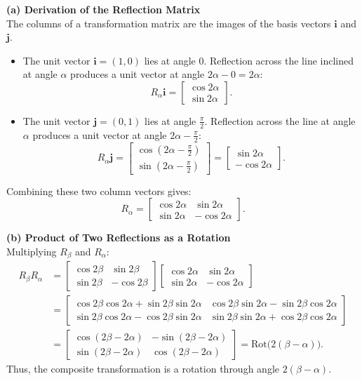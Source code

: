 \begin{solution}
\textbf{(a) Derivation of the Reflection Matrix} \\
The columns of a transformation matrix are the images of the basis vectors $\mathbf{i}$ and $\mathbf{j}$.
\begin{itemize}[leftmargin=*]
    \item The unit vector $\mathbf{i} = (1, 0)$ lies at angle $0$. Reflection across the line inclined at angle $\alpha$ produces a unit vector at angle $2\alpha - 0 = 2\alpha$:
    \[
    R_\alpha \mathbf{i} = \begin{bmatrix} \cos 2\alpha \\ \sin 2\alpha \end{bmatrix}.
    \]
    \item The unit vector $\mathbf{j} = (0, 1)$ lies at angle $\frac{\pi}{2}$. Reflection across the line at angle $\alpha$ produces a unit vector at angle $2\alpha - \frac{\pi}{2}$:
    \[
    R_\alpha \mathbf{j} = \begin{bmatrix} \cos(2\alpha - \frac{\pi}{2}) \\ \sin(2\alpha - \frac{\pi}{2}) \end{bmatrix} = \begin{bmatrix} \sin 2\alpha \\ -\cos 2\alpha \end{bmatrix}.
    \]
\end{itemize}
Combining these two column vectors gives:
\[
R_\alpha = \begin{bmatrix} \cos 2\alpha & \sin 2\alpha \\ \sin 2\alpha & -\cos 2\alpha \end{bmatrix}.
\]

\medskip
\textbf{(b) Product of Two Reflections as a Rotation} \\
Multiplying $R_\beta$ and $R_\alpha$:
\begin{align*}
R_\beta R_\alpha &= \begin{bmatrix} \cos 2\beta & \sin 2\beta \\ \sin 2\beta & -\cos 2\beta \end{bmatrix} \begin{bmatrix} \cos 2\alpha & \sin 2\alpha \\ \sin 2\alpha & -\cos 2\alpha \end{bmatrix} \\[4pt]
&= \begin{bmatrix} \cos 2\beta\cos 2\alpha + \sin 2\beta\sin 2\alpha & \cos 2\beta\sin 2\alpha - \sin 2\beta\cos 2\alpha \\ \sin 2\beta\cos 2\alpha - \cos 2\beta\sin 2\alpha & \sin 2\beta\sin 2\alpha + \cos 2\beta\cos 2\alpha \end{bmatrix} \\[4pt]
&= \begin{bmatrix} \cos(2\beta - 2\alpha) & -\sin(2\beta - 2\alpha) \\ \sin(2\beta - 2\alpha) & \cos(2\beta - 2\alpha) \end{bmatrix} = \text{Rot}\bigl(2(\beta - \alpha)\bigr).
\end{align*}
Thus, the composite transformation is a rotation through angle $2(\beta - \alpha)$.


\end{solution}
